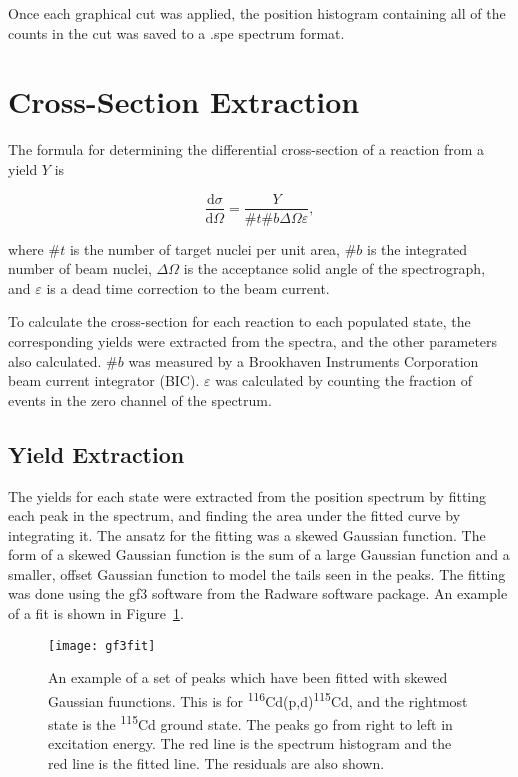 Once each graphical cut was applied, the position histogram containing all of the counts in the cut was saved to a .spe spectrum format.

\section{Cross-Section Extraction}

The formula for determining the differential cross-section of a reaction from a yield $Y$ is

\begin{equation} \label{eq:yieldxsection}
\frac{\mathrm{d}\sigma}{\mathrm{d}\Omega} = \frac{Y}{\#t\#b\Delta\Omega\varepsilon},
\end{equation}

where $\#t$ is the number of target nuclei per unit area, $\#b$ is the integrated number of beam nuclei, $\Delta\Omega$ is the acceptance solid angle of the spectrograph, and $\varepsilon$ is a dead time correction to the beam current.

To calculate the cross-section for each reaction to each populated state, the corresponding yields were extracted from the spectra, and the other parameters also calculated. $\#b$ was measured by a Brookhaven Instruments Corporation beam current integrator (BIC)\cite{bic}. $\varepsilon$ was calculated by counting the fraction of events in the zero channel of the spectrum.

\subsection{Yield Extraction}

The yields for each state were extracted from the position spectrum by fitting each peak in the spectrum, and finding the area under the fitted curve by integrating it. The ansatz for the fitting was a skewed Gaussian function. The form of a skewed Gaussian function is the sum of a large Gaussian function and a smaller, offset Gaussian function to model the tails seen in the peaks. The fitting was done using the gf3 software from the Radware software package\cite{radware}. An example of a fit is shown in Figure~\ref{gf3Fit}.

\begin{figure}[h]	
\hspace*{-0.5cm}
\begin{center}	
	\texttt{[image: gf3fit]}
\end{center}
			\caption[Example fit curve of a spectrum]{An example of a set of peaks which have been fitted with skewed Gaussian fuunctions. This is for \textsuperscript{116}Cd(p,d)\textsuperscript{115}Cd, and the rightmost state is the \textsuperscript{115}Cd ground state. The peaks go from right to left in excitation energy. The red line is the spectrum histogram and the red line is the fitted line. The residuals are also shown. }
		\label{gf3Fit}
\end{figure}
\FloatBarrier

